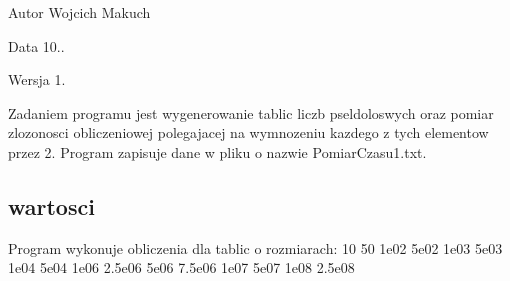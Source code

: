\begin{DoxyAuthor}{Autor}
Wojcich Makuch 
\end{DoxyAuthor}
\begin{DoxyDate}{Data}
10.. 
\end{DoxyDate}
\begin{DoxyVersion}{Wersja}
1.
\end{DoxyVersion}
Zadaniem programu jest wygenerowanie tablic liczb pseldoloswych oraz pomiar zlozonosci obliczeniowej polegajacej na wymnozeniu kazdego z tych elementow przez 2. Program zapisuje dane w pliku o nazwie Pomiar\+Czasu1.\+txt.\hypertarget{index_wartosci}{}\subsection{wartosci}\label{index_wartosci}
Program wykonuje obliczenia dla tablic o rozmiarach\+: 10 50 1e02 5e02 1e03 5e03 1e04 5e04 1e06 2.\+5e06 5e06 7.\+5e06 1e07 5e07 1e08 2.\+5e08 